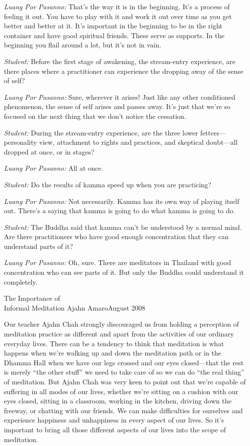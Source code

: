 \emph{Luang Por Pasanno:} That's the way it is in the beginning. It's a 
process of feeling it out. You have to play with it and work it out 
over time as you get better and better at it. It's important in the 
beginning to be in the right container and have good spiritual friends. 
These serve as supports. In the beginning you flail around a lot, but 
it's not in vain.

\emph{Student:} Before the first stage of awakening, the stream-entry 
experience, are there places where a practitioner can experience the 
dropping away of the sense of self?

\emph{Luang Por Pasanno:} Sure, wherever it arises! Just like any other 
conditioned phenomenon, the sense of self arises and passes away. It's 
just that we're so focused on the next thing that we don't notice the 
cessation.

\emph{Student:} During the stream-entry experience, are the three lower 
fetters---personality view, attachment to rights and practices, and 
skeptical doubt---all dropped at once, or in stages?

\emph{Luang Por Pasanno:} All at once.

\emph{Student:} Do the results of kamma speed up when you are 
practicing?

\emph{Luang Por Pasanno:} Not necessarily. Kamma has its own way of 
playing itself out. There's a saying that kamma is going to do what 
kamma is going to do.

\emph{Student:} The Buddha said that kamma can't be understood by a 
normal mind. Are there practitioners who have good enough concentration 
that they can understand parts of it?

\emph{Luang Por Pasanno:} Oh, sure. There are meditators in Thailand 
with good concentration who can see parts of it. But only the Buddha 
could understand it completely.

{The Importance of\\Informal Meditation}
{Ajahn Amaro}{August 2008}

Our teacher Ajahn Chah strongly discouraged us from holding a 
perception of meditation practice as different and apart from the 
activities of our ordinary everyday lives. There can be a tendency to 
think that meditation is what happens when we're walking up and down 
the meditation path or in the Dhamma Hall when we have our legs crossed 
and our eyes closed---that the rest is merely ``the other stuff'' we 
need to take care of so we can do ``the real thing'' of meditation. But 
Ajahn Chah was very keen to point out that we're capable of suffering 
in all modes of our lives, whether we're sitting on a cushion with our 
eyes closed, sitting in a classroom, working in the kitchen, driving 
down the freeway, or chatting with our friends. We can make 
difficulties for ourselves and experience happiness and unhappiness in 
every aspect of our lives. So it's important to bring all those 
different aspects of our lives into the scope of meditation.

